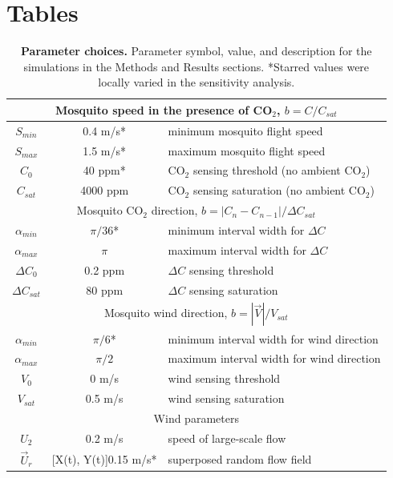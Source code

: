 \documentclass[10pt]{article}
\begin{document}
\newpage
\section*{Tables}
		
\begin{table}[!htp]
\caption{
{\bf Parameter choices.} Parameter symbol, value, and description for the simulations in the Methods and Results sections. *Starred values were locally varied in the sensitivity analysis. }
	\begin{center}
		\begin{tabular}{|c|c|l|}
			\hline
			\multicolumn{3}{|c|}{Mosquito speed in the presence of CO$_2$, $b=C/C_{sat}$} \\
			\hline 
			$S_{min}$ & 0.4 m/s* & minimum mosquito flight speed\\
			$S_{max}$ &  1.5 m/s* & maximum mosquito flight speed\\
			$C_0$ & 40 ppm* & CO$_2$ sensing threshold (no ambient CO$_2$)\\
			$C_{sat}$ & 4000 ppm & CO$_2$ sensing saturation (no ambient CO$_2$)\\
			\hline \hline
			\multicolumn{3}{|c|}{Mosquito CO$_2$ direction, $b=|C_{n}-C_{n-1}|/\Delta C_{sat}$} \\
			\hline
			$\alpha_{min}$  & $\pi/36$* & minimum interval width for $\Delta C$\\
			$\alpha_{max}$   & $\pi$ & maximum interval width for $\Delta C$\\
			$\Delta C_0$ & 0.2 ppm & $\Delta C$ sensing threshold\\
			$\Delta C_{sat}$ &  80 ppm & $\Delta C$ sensing saturation\\
			\hline \hline
			\multicolumn{3}{|c|}{Mosquito wind direction, $b=|\vec{V}|/V_{sat}$} \\
			 \hline
			$\alpha_{min}$ & $\pi/6$* & minimum interval width for wind direction \\
			$\alpha_{max}$ & $\pi/2$ & maximum interval width for wind direction \\
			$V_0$ &  0 m/s & wind sensing threshold\\
			$V_{sat}$ & 0.5 m/s & wind sensing saturation\\
			\hline \hline
			\multicolumn{3}{|c|}{Wind parameters} \\
			\hline 
			$U_2$  & 0.2 m/s & speed of large-scale flow\\
			$\vec{U}_r$  & [X(t), Y(t)]0.15 m/s* & superposed random flow field \\[5pt]

\end{tabular}
\end{center}
\end{table}
\end{document}
